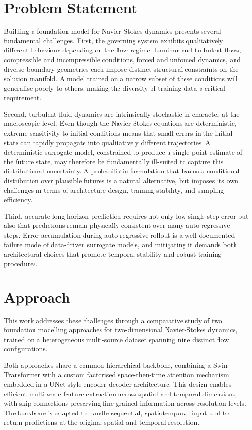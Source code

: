\section{Problem Statement}

Building a foundation model for Navier-Stokes dynamics presents several fundamental challenges. First, the governing system exhibits qualitatively different behaviour depending on the flow regime. Laminar and turbulent flows, compressible and incompressible conditions, forced and unforced dynamics, and diverse boundary geometries each impose distinct structural constraints on the solution manifold. A model trained on a narrow subset of these conditions will generalise poorly to others, making the diversity of training data a critical requirement.

Second, turbulent fluid dynamics are intrinsically stochastic in character at the macroscopic level. Even though the Navier-Stokes equations are deterministic, extreme sensitivity to initial conditions means that small errors in the initial state can rapidly propagate into qualitatively different trajectories. A deterministic surrogate model, constrained to produce a single point estimate of the future state, may therefore be fundamentally ill-suited to capture this distributional uncertainty. A probabilistic formulation that learns a conditional distribution over plausible futures is a natural alternative, but imposes its own challenges in terms of architecture design, training stability, and sampling efficiency.

Third, accurate long-horizon prediction requires not only low single-step error but also that predictions remain physically consistent over many auto-regressive steps. Error accumulation during auto-regressive rollout is a well-documented failure mode of data-driven surrogate models, and mitigating it demands both architectural choices that promote temporal stability and robust training procedures.

\section{Approach}

This work addresses these challenges through a comparative study of two foundation modelling approaches for two-dimensional Navier-Stokes dynamics, trained on a heterogeneous multi-source dataset spanning nine distinct flow configurations.

Both approaches share a common hierarchical backbone, combining a Swin Transformer \citep{liu2021swin} with a custom factorised space-then-time attention mechanism embedded in a UNet-style encoder-decoder architecture. This design enables efficient multi-scale feature extraction across spatial and temporal dimensions, with skip connections preserving fine-grained information across resolution levels. The backbone is adapted to handle sequential, spatiotemporal input and to return predictions at the original spatial and temporal resolution.

